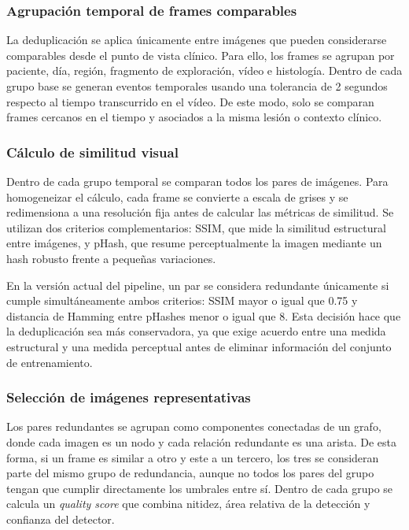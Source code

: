 ﻿\documentclass[10pt,a4paper,twocolumn,twoside]{article}
\begin{document}
\subsubsection{Agrupación temporal de frames comparables}
La deduplicación se aplica únicamente entre imágenes que pueden considerarse comparables desde el punto de vista clínico. Para ello, los frames se agrupan por paciente, día, región, fragmento de exploración, vídeo e histología. Dentro de cada grupo base se generan eventos temporales usando una tolerancia de 2 segundos respecto al tiempo transcurrido en el vídeo. De este modo, solo se comparan frames cercanos en el tiempo y asociados a la misma lesión o contexto clínico.

\subsubsection{Cálculo de similitud visual}
Dentro de cada grupo temporal se comparan todos los pares de imágenes. Para homogeneizar el cálculo, cada frame se convierte a escala de grises y se redimensiona a una resolución fija antes de calcular las métricas de similitud. Se utilizan dos criterios complementarios: SSIM, que mide la similitud estructural entre imágenes, y pHash, que resume perceptualmente la imagen mediante un hash robusto frente a pequeñas variaciones.

En la versión actual del pipeline, un par se considera redundante únicamente si cumple simultáneamente ambos criterios: SSIM mayor o igual que 0.75 y distancia de Hamming entre pHashes menor o igual que 8. Esta decisión hace que la deduplicación sea más conservadora, ya que exige acuerdo entre una medida estructural y una medida perceptual antes de eliminar información del conjunto de entrenamiento.

\subsubsection{Selección de imágenes representativas}
Los pares redundantes se agrupan como componentes conectadas de un grafo, donde cada imagen es un nodo y cada relación redundante es una arista. De esta forma, si un frame es similar a otro y este a un tercero, los tres se consideran parte del mismo grupo de redundancia, aunque no todos los pares del grupo tengan que cumplir directamente los umbrales entre sí. Dentro de cada grupo se calcula un \textit{quality score} que combina nitidez, área relativa de la detección y confianza del detector.
\end{document}
